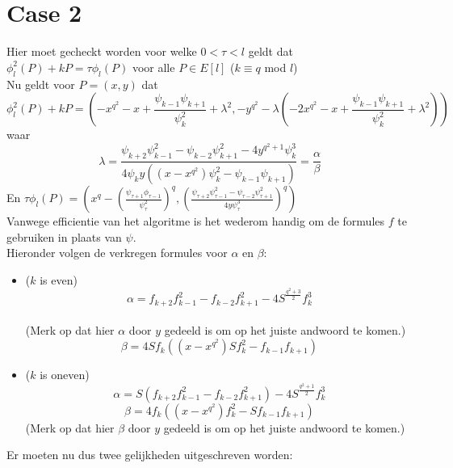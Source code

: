 \documentclass[10pt]{article}
\begin{document}
\section{Case 2}

Hier moet gecheckt worden voor welke $0<\tau<l$ geldt dat $\phi_l^2(P)+kP=\tau \phi_l(P)$ voor alle $P \in E[l]$ ($k \equiv q$ mod $l$)\\
Nu geldt voor $P=(x,y)$ dat $$\phi^2_l(P)+kP = (-x^{q^2}-x+\frac{\psi_{k-1}\psi_{k+1}}{\psi_k^2}+\lambda^2,-y^{q^2}-\lambda(-2x^{q^2}-x+\frac{\psi_{k-1}\psi_{k+1}}{\psi_k^2}+\lambda^2))$$
waar
$$ \lambda=\frac{\psi_{k+2}\psi_{k-1}^2-\psi_{k-2}\psi_{k+1}^2-4y^{q^2+1}\psi_k^3}{4\psi_ky((x-x^{q^2})\psi_k^2-\psi_{k-1}\psi_{k+1})}=\frac{\alpha}{\beta} $$
En $\tau \phi_l(P) = (x^q-(\frac{\psi_{\tau+1}\phi_{\tau-1}}{\psi_\tau^2})^q,(\frac{\psi_{\tau+2}\psi_{\tau-1}^2-\psi_{\tau-2}\psi_{\tau+1}^2}{4y\psi_\tau^3})^q)$\\
Vanwege efficientie van het algoritme is het wederom handig om de formules $f$ te gebruiken in plaats van $\psi$.\\
Hieronder volgen de verkregen formules voor $\alpha$ en $\beta$:

\begin{itemize}
\item ($k$ is even) $$\alpha=f_{k+2}f^2_{k-1}-f_{k-2}f^2_{k+1}-4S^{\frac{q^2+3}{2}}f_k^3$$ \\
(Merk op dat hier $\alpha$ door $y$ gedeeld is om op het juiste andwoord te komen.)\\
$$\beta=4Sf_k((x-x^{q^2})Sf_k^2-f_{k-1}f_{k+1})$$
\item ($k$ is oneven) $$\alpha=S(f_{k+2}f^2_{k-1}-f_{k-2}f^2_{k+1})-4S^\frac{q^2+1}{2}f^3_k$$
$$\beta=4f_k((x-x^{q^2})f_k^2-Sf_{k-1}f_{k+1})$$
(Merk op dat hier $\beta$ door $y$ gedeeld is om op het juiste andwoord te komen.)
\end{itemize} 
Er moeten nu dus twee gelijkheden uitgeschreven worden:
\end{document}

